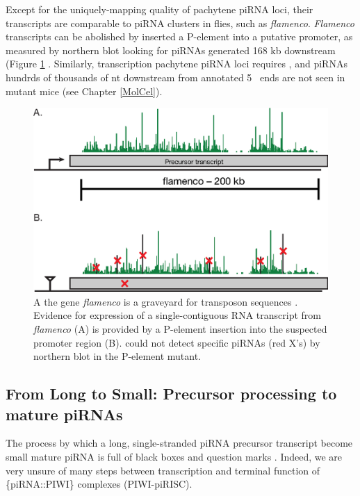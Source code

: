     Except for the uniquely-mapping quality of pachytene piRNA loci, their transcripts are comparable to piRNA clusters in flies, such as \textit{flamenco}. \textit{Flamenco} transcripts can be abolished by inserted a P-element into a putative promoter, as measured by northern blot looking for piRNAs generated 168 kb downstream (Figure \ref{Intro:fig:flamenco} \citep{Brennecke2007,Goriaux2014}. Similarly, transcription pachytene piRNA loci requires \amyb{}, and piRNAs hundrds of thousands of nt downstream from annotated 5\textprime~ ends are not seen in \amyb{} mutant mice (see Chapter \ref{MolCel}).

    \begin{figure} %
      \centering 
      \includegraphics{Figures/Intro/FlamencoLocus.eps}
      \caption[Genetic evidence for long, continuous fly piRNA precursor transcripts]
      {
        A the \flies{} gene \textit{flamenco} is a graveyard for transposon sequences \citep{Pelisson1994}. Evidence for expression of a single-contiguous RNA transcript from \textit{flamenco} (A) is provided by a P-element insertion into the suspected promoter region (B). \citep{Brennecke2007} could not detect specific piRNAs (red X's) by northern blot in the P-element mutant.
        }
      \label{Intro:fig:flamenco}
      \end{figure}

  \subsection{From Long to Small: Precursor processing to mature piRNAs}
    \label{Intro:subsec:Processing of piRNAs in mice}

    The process by which a long, single-stranded piRNA precursor transcript become small mature piRNA is full of black boxes and question marks \citep{Li2013e}. Indeed, we are very unsure of many steps between transcription and terminal function of \{piRNA::PIWI\} complexes (PIWI-piRISC).

